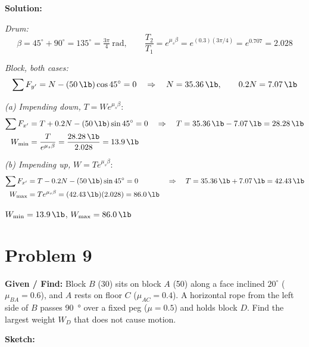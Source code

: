 \documentclass[11pt]{article}
\newcommand{\problem}[1]{\clearpage\section*{Problem #1}}
\begin{document}
\textbf{Solution:}

\textit{Drum:}
\[
    \beta = 45^\circ + 90^\circ = 135^\circ = \tfrac{3\pi}{4}\ \text{rad}, \qquad
    \frac{T_2}{T_1} = e^{\mu_s\beta} = e^{(0.3)(3\pi/4)} = e^{0.707} = 2.028
\]

\textit{Block, both cases:}
\[
    \sum F_{y'} = N - (\SI{50}{\lb})\cos 45^\circ = 0 \quad\Rightarrow\quad N = \SI{35.36}{\lb}, \qquad 0.2N = \SI{7.07}{\lb}
\]

\textit{(a) Impending down,} $T = We^{\mu_s\beta}$:
\begin{align*}
    \sum F_{x'} &= T + 0.2N - (\SI{50}{\lb})\sin 45^\circ = 0 &&\Rightarrow\quad T = \SI{35.36}{\lb} - \SI{7.07}{\lb} = \SI{28.28}{\lb} \\
    W_{\min} &= \frac{T}{e^{\mu_s\beta}} = \frac{\SI{28.28}{\lb}}{2.028} = \SI{13.9}{\lb}
\end{align*}

\textit{(b) Impending up,} $W = Te^{\mu_s\beta}$:
\begin{align*}
    \sum F_{x'} &= T - 0.2N - (\SI{50}{\lb})\sin 45^\circ = 0 &&\Rightarrow\quad T = \SI{35.36}{\lb} + \SI{7.07}{\lb} = \SI{42.43}{\lb} \\
    W_{\max} &= Te^{\mu_s\beta} = (\SI{42.43}{\lb})(2.028) = \SI{86.0}{\lb}
\end{align*}

\begin{finalanswer}
    $W_{\min} = \SI{13.9}{\lb}$, \qquad $W_{\max} = \SI{86.0}{\lb}$
\end{finalanswer}

\problem{9}

\textbf{Given / Find:} Block $B$ (\SI{30}{\lb}) sits on block $A$ (\SI{50}{\lb}) along a face inclined $20^\circ$ ($\mu_{BA} = 0.6$), and $A$ rests on floor $C$ ($\mu_{AC} = 0.4$). A horizontal rope from the left side of $B$ passes \SI{90}{\degree} over a fixed peg ($\mu = 0.5$) and holds block $D$. Find the largest weight $W_D$ that does not cause motion.

\textbf{Sketch:}
\end{document}
